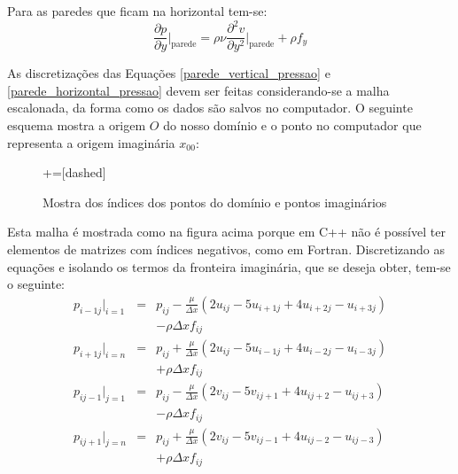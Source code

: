 \documentclass[journal]{IEEEtran}
\begin{document}
Para as paredes que ficam na horizontal tem-se:
\begin{equation}
\frac{\partial p}{\partial y}\Bigg|_{\textrm{parede}}=\rho\nu\frac{\partial^2
v}{\partial y^2}\Bigg|_{\textrm{parede}}+\rho f_y \label{parede_horizontal_pressao}
\end{equation}

As discretizações das Equações \ref{parede_vertical_pressao} e \ref{parede_horizontal_pressao} devem ser feitas considerando-se a malha escalonada, da forma como os dados são salvos no computador. O seguinte esquema mostra a origem $O$ do nosso domínio e o ponto no computador que representa a origem imaginária $x_{00}$:

\begin{figure}
\centering
{}+=[dashed]%
\caption{Mostra dos índices dos pontos do domínio e pontos imaginários}
\end{figure}
Esta malha é mostrada como na figura acima porque em C++ não é possível ter elementos de matrizes com índices negativos, como em Fortran. Discretizando as equações e isolando os termos da fronteira imaginária, que se deseja obter, tem-se o seguinte:
\begin{eqnarray}
p_{i-1j}|_{i=1}&=&p_{ij}-\frac{\mu}{\Delta x}\left(2u_{ij}-5u_{i+1j}+4u_{i+2j}-u_{i+3j}\right)\nonumber\\ & & -\rho\Delta x f_{ij}\\
p_{i+1j}|_{i=n}&=&p_{ij}+\frac{\mu}{\Delta x}\left(2u_{ij}-5u_{i-1j}+4u_{i-2j}-u_{i-3j}\right)\nonumber\\ & &+\rho\Delta x f_{ij}\\
p_{ij-1}|_{j=1}&=&p_{ij}-\frac{\mu}{\Delta x}\left(2v_{ij}-5v_{ij+1}+4u_{ij+2}-u_{ij+3}\right)\nonumber\\& &-\rho\Delta x f_{ij}\\
p_{ij+1}|_{j=n}&=&p_{ij}+\frac{\mu}{\Delta x}\left(2v_{ij}-5v_{ij-1}+4u_{ij-2}-u_{ij-3}\right)\nonumber\\& &+\rho\Delta x f_{ij}
\end{eqnarray}
\end{document}
